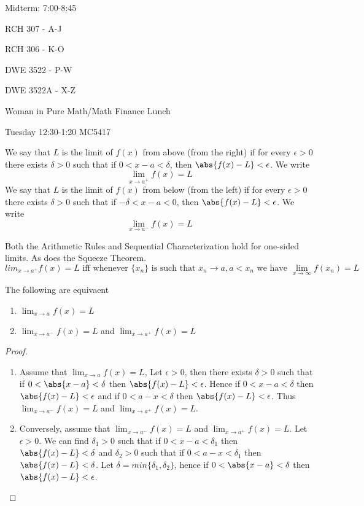 
Midterm: 7:00-8:45

RCH 307 - A-J

RCH 306 - K-O

DWE 3522 - P-W

DWE 3522A - X-Z

Woman in Pure Math/Math Finance Lunch

Tuesday 12:30-1:20 MC5417

\begin{defn}
We say that $L$ is the limit of $f(x)$ from above (from the right) if for every $\epsilon > 0$ there exists $\delta > 0$ such that if $0<x-a<\delta$, then $\abs{f(x) - L}<\epsilon$. We write \[\lim_{x\to a^+} f(x) = L\]
We say that $L$ is the limit of $f(x)$ from below (from the left) if for every $\epsilon > 0$ there exists $\delta > 0$ such that if $-\delta<x-a<0$, then $\abs{f(x) - L}<\epsilon$. We write \[\lim_{x\to a^-} f(x) = L\]
\end{defn}

\begin{note}
Both the Arithmetic Rules and Sequential Characterization hold for one-sided limits. As does the Squeeze Theorem.
\[lim_{x\to a^+} f(x) = L \text{ iff whenever } \{x_n\} \text{ is such that } x_n\to a, a<x_n \text{ we have } \lim_{x\to\infty} f(x_n) = L\]
\end{note}

\begin{thm}
The following are equivaent
\begin{enumerate}
\item \(\lim_{x\to a} f(x) = L\)
\item \(\lim_{x\to a^-} f(x) = L\) and \(\lim_{x\to a^+} f(x) = L\)
\end{enumerate}
\end{thm}

\begin{proof}
\begin{enumerate}
\item Assume that \(\lim_{x\to a} f(x) = L\), Let \(\epsilon > 0\), then there exists \(\delta>0\) such that if $0 < \abs{x-a} < \delta$ then $\abs{f(x)- L} < \epsilon$.  Hence if $0<x-a < \delta$ then $\abs{f(x) - L} < \epsilon$ and if $0<a-x < \delta$ then $\abs{f(x) - L} < \epsilon$. Thus \(\lim_{x\to a^-} f(x) = L\) and \(\lim_{x\to a^+} f(x) = L\).
\item Conversely, assume that \(\lim_{x\to a^-} f(x) = L\) and \(\lim_{x\to a^+} f(x) = L\). Let $\epsilon > 0$. We can find $\delta_1 > 0$ such that if $0 < x-a < \delta_1$ then $\abs{f(x) - L} < \delta$ and $\delta_2 > 0$ such that if $0 < a-x < \delta_1$ then $\abs{f(x) - L} < \delta$. Let $\delta = min\{\delta_1,\delta_2\}$, hence if $0 < \abs{x-a} < \delta$ then $\abs{f(x) - L} < \epsilon$.
\end{enumerate}
\end{proof}

